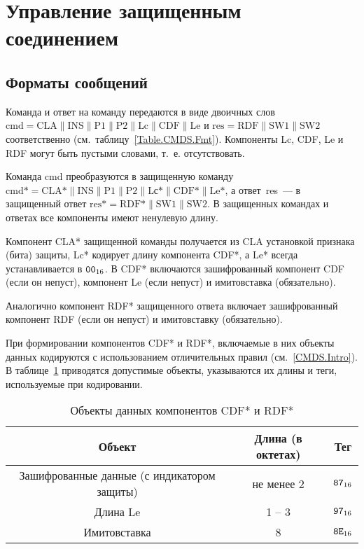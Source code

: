 \section{Управление защищенным соединением}
\label{CMDS.SM}

\subsection{Форматы сообщений}\label{CMDS.SM.Format}

Команда и ответ на команду передаются в виде двоичных слов 
$\text{cmd} = \text{CLA} \parallel \text{INS} \parallel \text{P1} \parallel 
\text{P2} \parallel \text{Lc} \parallel \text{CDF} \parallel \text{Le}$ и 
$\text{res} = \text{RDF} \parallel \text{SW1} \parallel \text{SW2}$ 
соответственно (см.~таблицу~\ref{Table.CMDS.Fmt}). 
%
Компоненты Lc, CDF, Le и RDF могут быть пустыми словами, т.~е. отсутствовать.

Команда cmd преобразуются в защищенную команду 
$\text{cmd*} = \text{CLA*} \parallel \text{INS} \parallel \text{P1} 
\parallel \text{P2} \parallel \text{Lс*} \parallel \text{CDF*} 
\parallel \text{Le*}$, а ответ~res~--- в защищенный ответ 
$\text{res*} = \text{RDF*} \parallel \text{SW1} \parallel \text{SW2}$. 
%
В защищенных командах и ответах все компоненты имеют ненулевую длину. 

Компонент CLA* защищенной команды получается из CLA установкой признака 
(бита) защиты, Lc* кодирует длину компонента CDF*, 
а Le* всегда устанавливается в $\texttt{00}_{16}$. 
%
В CDF* включаются зашифрованный компонент CDF (если он непуст), 
компонент Le (если непуст) и имитовставка (обязательно). 

Аналогично компонент RDF* защищенного ответа включает зашифрованный 
компонент RDF (если он непуст) и имитовставку (обязательно). 

При формировании компонентов CDF* и RDF*, включаемые в них объекты данных
кодируются с использованием отличительных правил (см.~\ref{CMDS.Intro}). 
В таблице~\ref{Table.CMDS.CDFRDF} приводятся допустимые объекты, 
указываются их длины и теги, используемые при кодировании. 

\begin{table}[h]
\caption{Объекты данных компонентов CDF* и RDF*}
\label{Table.CMDS.CDFRDF}
\begin{tabular}{|c|c|c|}
\hline
Объект & Длина (в октетах) & Тег \\
\hline
\hline
Зашифрованные данные (с индикатором защиты) & не менее 2 & $\texttt{87}_{16}$ \\
\hline
Длина Le & 1 -- 3 & $\texttt{97}_{16}$\\
\hline      
Имитовставка & 8 & $\texttt{8E}_{16}$ \\
\hline
\end{tabular}
\end{table}

